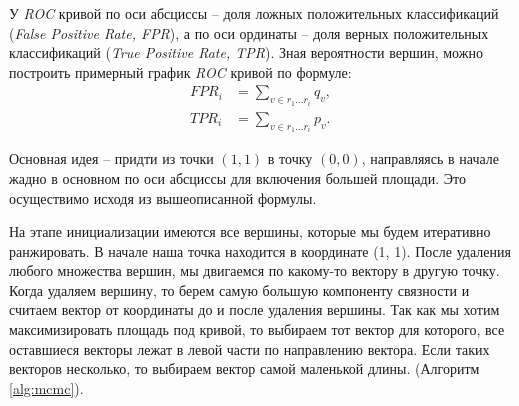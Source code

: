 У \emph{ROC} кривой по оси абсциссы -- доля ложных положительных классификаций
(\emph{False Positive Rate, FPR}), а по оси ординаты -- доля верных
положительных классификаций (\emph{True Positive Rate, TPR}).  Зная вероятности
вершин, можно построить примерный график \emph{ROC} кривой по формуле:
\begin{align*}
    FPR_i &=\sum_{v \in r_1 \ldots r_i}{q_v},\\
    TPR_i &= \sum_{v \in r_1 \ldots r_i}{p_v}.
\end{align*}

Основная идея -- придти из точки $(1, 1)$ в точку $(0, 0)$, направляясь в начале
жадно в основном по оси абсциссы для включения большей площади.  Это
осуществимо исходя из вышеописанной формулы.

На этапе инициализации имеются все вершины, которые мы будем итеративно
ранжировать. В начале наша точка находится в координате (1, 1).  После удаления
любого множества вершин, мы двигаемся по какому-то вектору в другую точку.
Когда удаляем вершину, то берем самую большую компоненту связности и считаем
вектор от координаты до и после удаления вершины.  Так как мы хотим
максимизировать площадь под кривой, то выбираем тот вектор для которого, все
оставшиеся векторы лежат в левой части по направлению вектора.  Если таких
векторов несколько, то выбираем вектор самой маленькой длины.
(Алгоритм \ref{alg:mcmc}).

